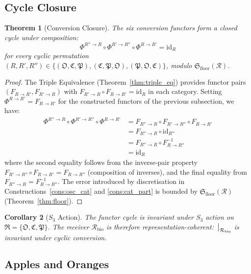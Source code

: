 \documentclass[11pt,twocolumn,a4paper]{article}
\newtheorem{theorem}{Theorem}[section]
\newtheorem{corollary}[theorem]{Corollary}
\theoremstyle{definition}
\theoremstyle{remark}
\newcommand{\Recv}{\mathcal{R}}
\newcommand{\Floor}{{\mathfrak{S}_{\mathrm{floor}}}}
\newcommand{\Osc}{\mathfrak{O}}
\newcommand{\Cat}{\mathfrak{C}}
\newcommand{\Part}{\mathfrak{P}}
\newcommand{\Reps}{\mathfrak{R}}
\begin{document}
\subsection{Cycle Closure}

\begin{theorem}[Conversion Closure]
\label{thm:cycle_closure}
The six conversion functors form a closed cycle under composition:
\begin{equation}
\Phi^{R'' \to R} \circ \Phi^{R' \to R''} \circ \Phi^{R \to R'} = \mathrm{id}_R
\end{equation}
for every cyclic permutation $(R, R', R'') \in \{(\Osc, \Cat, \Part), (\Cat, \Part, \Osc), (\Part, \Osc, \Cat)\}$, modulo $\Floor(\Recv)$.
\end{theorem}

\begin{proof}
The Triple Equivalence (Theorem~\ref{thm:triple_eq}) provides functor pairs $(F_{R \to R'}, F_{R' \to R})$ with $F_{R' \to R} \circ F_{R \to R'} = \mathrm{id}_R$ in each category. Setting $\Phi^{R \to R'} = F_{R \to R'}$ for the constructed functors of the previous subsection, we have:
\begin{align}
\Phi^{R'' \to R} \circ \Phi^{R' \to R''} \circ \Phi^{R \to R'} &= F_{R'' \to R} \circ F_{R' \to R''} \circ F_{R \to R'} \\
&= F_{R'' \to R} \circ \mathrm{id}_{R''} \\
&= F_{R'' \to R} \circ F_{R \to R''}^{-1} \\
&= \mathrm{id}_R
\end{align}
where the second equality follows from the inverse-pair property $F_{R' \to R''} \circ F_{R \to R'} = F_{R \to R''}$ (composition of inverses), and the final equality from $F_{R'' \to R} = F_{R \to R''}^{-1}$. The error introduced by discretisation in Constructions~\ref{cons:osc_cat} and \ref{cons:cat_part} is bounded by $\Floor(\Recv)$ (Theorem~\ref{thm:floor}).
\end{proof}

\begin{corollary}[$S_3$ Action]
\label{cor:S3}
The functor cycle is invariant under $S_3$ action on $\Reps = \{\Osc, \Cat, \Part\}$. The receiver $\Recv_{\mathrm{bio}}$ is therefore representation-coherent: $\eval_{\Recv_{\mathrm{bio}}}$ is invariant under cyclic conversion.
\end{corollary}

\subsection{Apples and Oranges}
\end{document}
